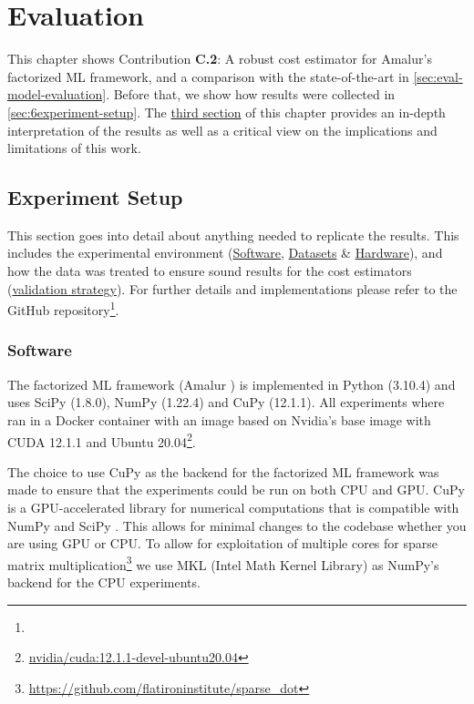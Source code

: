 
\chapter{Evaluation}
\label{chapter:evaluation-discussion}
This chapter shows Contribution \textbf{C.2}: A robust cost estimator for Amalur's factorized ML framework, and a comparison with the state-of-the-art in \autoref{sec:eval-model-evaluation}. Before that, we show how results were collected in \autoref{sec:6experiment-setup}. The \hyperref[sec:eval-discussion]{third section} of this chapter provides an in-depth interpretation of the results as well as a critical view on the implications and limitations of this work.

\section{Experiment Setup}
\label{sec:6experiment-setup}

This section goes into detail about anything needed to replicate the results. This includes the experimental environment (\hyperref[subsec:6-software]{Software}, \hyperref[subsec:6-datasets]{Datasets} \& \hyperref[subsec:6-hardware]{Hardware}),  and how the data was treated to ensure sound results for the cost estimators (\hyperref[subsec:6-validation-strategy]{validation strategy}). For further details and implementations please refer to the GitHub repository\footnote{}.

\subsection{Software}
\label{subsec:6-software}
The factorized ML framework (Amalur \cite{amalur}) is implemented in Python (3.10.4) and uses SciPy (1.8.0), NumPy (1.22.4) and CuPy (12.1.1). All experiments where ran in a Docker container with an image based on Nvidia's base image with CUDA 12.1.1 and Ubuntu 20.04\footnote{\href{https://hub.docker.com/layers/nvidia/cuda/12.1.1-devel-ubuntu20.04/images/sha256-5bd13c67a4479a1c13238b470d89a92937ce68ba5f21b930d50c463e3314f657?context=explore}{nvidia/cuda:12.1.1-devel-ubuntu20.04}}.

The choice to use CuPy as the backend for the factorized ML framework was made to ensure that the experiments could be run on both CPU and GPU. CuPy is a GPU-accelerated library for numerical computations that is compatible with NumPy and SciPy \cite{cupy_learningsys2017}. This allows for minimal changes to the codebase whether you are using GPU or CPU. To allow for exploitation of multiple cores for sparse matrix multiplication\footnote{\url{https://github.com/flatironinstitute/sparse_dot}} we use MKL (Intel Math Kernel Library) \cite{intel-mkl} as NumPy's backend for the CPU experiments.

